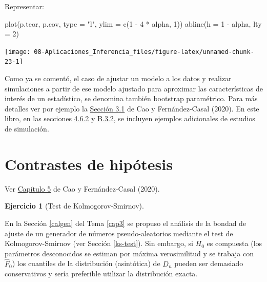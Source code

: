 \documentclass[
]{book}
\newenvironment{Shaded}{\begin{snugshade}}{\end{snugshade}}
\newcommand{\AttributeTok}[1]{\textcolor[rgb]{0.77,0.63,0.00}{#1}}
\newcommand{\DecValTok}[1]{\textcolor[rgb]{0.00,0.00,0.81}{#1}}
\newcommand{\FunctionTok}[1]{\textcolor[rgb]{0.00,0.00,0.00}{#1}}
\newcommand{\NormalTok}[1]{#1}
\newcommand{\SpecialCharTok}[1]{\textcolor[rgb]{0.00,0.00,0.00}{#1}}
\newcommand{\StringTok}[1]{\textcolor[rgb]{0.31,0.60,0.02}{#1}}
\theoremstyle{break}
\theoremstyle{definition}
\theoremstyle{definition}
\theoremstyle{definition}
\newtheorem{exercise}{Ejercicio}[chapter]
\theoremstyle{definition}
\theoremstyle{remark}
\begin{document}
\begin{enumerate}
  Representar:

\begin{Shaded}
\begin{Highlighting}[]
\FunctionTok{plot}\NormalTok{(p.teor, p.cov, }\AttributeTok{type =} \StringTok{"l"}\NormalTok{, }\AttributeTok{ylim =} \FunctionTok{c}\NormalTok{(}\DecValTok{1} \SpecialCharTok{{-}} \DecValTok{4} \SpecialCharTok{*}\NormalTok{ alpha, }\DecValTok{1}\NormalTok{))}
\FunctionTok{abline}\NormalTok{(}\AttributeTok{h =} \DecValTok{1} \SpecialCharTok{{-}}\NormalTok{ alpha, }\AttributeTok{lty =} \DecValTok{2}\NormalTok{) }
\end{Highlighting}
\end{Shaded}

  \begin{center}\texttt{[image: 08-Aplicaciones\_Inferencia\_files/figure-latex/unnamed-chunk-23-1]} \end{center}
\end{enumerate}

Como ya se comentó, el caso de ajustar un modelo a los datos y realizar simulaciones a partir de ese modelo ajustado para aproximar las características de interés de un estadístico, se denomina también bootstrap paramétrico.
Para más detalles ver por ejemplo la \href{https://rubenfcasal.github.io/book_remuestreo/modunif-boot-par.html}{Sección 3.1} de Cao y Fernández-Casal (2020).
En este libro, en las secciones \href{https://rubenfcasal.github.io/book_remuestreo/icboot-ejem.html\#estudio-sim-exp}{4.6.2} y \href{https://rubenfcasal.github.io/book_remuestreo/ejemplos-3.html\#estudio-sim-boot}{B.3.2}, se incluyen ejemplos adicionales de estudios de simulación.

\hypertarget{contrastes}{%
\section{Contrastes de hipótesis}\label{contrastes}}

Ver \href{https://rubenfcasal.github.io/book_remuestreo/contrastes.html}{Capítulo 5} de Cao y Fernández-Casal (2020).

\begin{exercise}[Test de Kolmogorov-Smirnov]
\protect\hypertarget{exr:ks-test-sim}{}{\label{exr:ks-test-sim} {} }
\end{exercise}

En la Sección \ref{calgen} del Tema \ref{cap3} se propuso el análisis de la bondad de ajuste de un generador de números pseudo-aleatorios mediante el test de Kolmogorov-Smirnov (ver Sección \ref{ks-test}).
Sin embargo, si \(H_{0}\) es compuesta (los parámetros desconocidos se estiman por máxima verosimilitud y se trabaja con \(\hat{F}_{0}\)) los cuantiles de la distribución (asintótica) de \(D_{n}\) pueden ser demasiado conservativos y sería preferible utilizar la distribución exacta.
\end{document}
